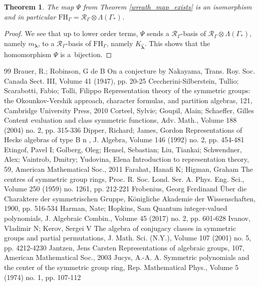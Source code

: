 \documentclass[10pt]{article}
\newtheorem{theorem}{Theorem}[section]
\theoremstyle{definition}
\newcommand{\bs}{\boldsymbol}
\newcommand{\RGamma}{\mathcal{R}_{\Gamma}}
\newcommand{\LambdaG}{\Lambda(\Gamma_*)}
\newcommand{\FHG}{\mathrm{FH}_{\Gamma}}
\begin{document}
\begin{theorem} \label{main_thm}
The map $\Psi$ from Theorem \ref{wreath_map_exists} is an isomorphism and in particular $\FHG = \RGamma \otimes \LambdaG$.
\end{theorem}

\begin{proof}
We see that up to lower order terms, $\Psi$ sends a $\RGamma$-basis of $\RGamma \otimes \LambdaG$, namely $m_{\bs\lambda}$, to a $\RGamma$-basis of $\FHG$, namely $K_{\bm\hat{\bs\lambda}}$. This shows that the homomorphism $\Psi$ is a~bijection.
\end{proof}

\begin{thebibliography}{99}
Brauer, R.; Robinson, G de B On a conjecture by Nakayama, Trans. Roy. Soc. Canada Sect. III, Volume 41 (1947), pp. 20-25
Ceccherini-Silberstein, Tullio; Scarabotti, Fabio; Tolli, Filippo Representation theory of the symmetric groups: the Okounkov-Vershik approach, character formulas, and partition algebras, 121, Cambridge University Press, 2010
Corteel, Sylvie; Goupil, Alain; Schaeffer, Gilles Content evaluation and class symmetric functions, Adv. Math., Volume 188 (2004) no. 2, pp. 315-336
Dipper, Richard; James, Gordon Representations of Hecke algebras of type B n , J. Algebra, Volume 146 (1992) no. 2, pp. 454-481
Etingof, Pavel I; Golberg, Oleg; Hensel, Sebastian; Liu, Tiankai; Schwendner, Alex; Vaintrob, Dmitry; Yudovina, Elena Introduction to representation theory, 59, American Mathematical Soc., 2011
Farahat, Hanafi K; Higman, Graham The centres of symmetric group rings, Proc. R. Soc. Lond. Ser. A. Phys. Eng. Sci., Volume 250 (1959) no. 1261, pp. 212-221
Frobenius, Georg Ferdinand Über die Charaktere der symmetrischen Gruppe, Königliche Akademie der Wissenschaften, 1900, pp. 516-534
Harman, Nate; Hopkins, Sam Quantum integer-valued polynomials, J. Algebraic Combin., Volume 45 (2017) no. 2, pp. 601-628
Ivanov, Vladimir N; Kerov, Sergei V The algebra of conjugacy classes in symmetric groups and partial permutations, J. Math. Sci. (N.Y.), Volume 107 (2001) no. 5, pp. 4212-4230
Jantzen, Jens Carsten Representations of algebraic groups, 107, American Mathematical Soc., 2003
Jucys, A.-A. A. Symmetric polynomials and the center of the symmetric group ring, Rep. Mathematical Phys., Volume 5 (1974) no. 1, pp. 107-112

\end{thebibliography}
\end{document}
